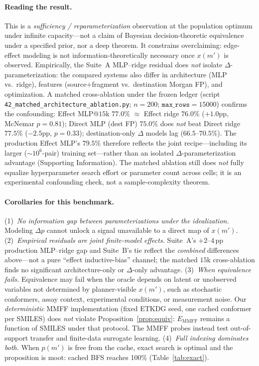 \documentclass[journal=jcisd8,manuscript=article,email=false]{achemso}
\begin{document}
\paragraph{Reading the result.}
This is a \emph{sufficiency / reparameterization} observation at the population optimum under infinite capacity---not a claim of Bayesian decision-theoretic equivalence under a specified prior, nor a deep theorem. It constrains overclaiming: edge-effect modeling is not information-theoretically necessary once $x(m')$ is observed. Empirically, the Suite~A MLP--ridge residual does \emph{not} isolate $\Delta$-parameterization: the compared systems also differ in architecture (MLP vs.\ ridge), features (source$+$fragment vs.\ destination Morgan FP), and optimization. A matched cross-ablation under the frozen ledger (script \texttt{42\_matched\_architecture\_ablation.py}; $n{=}200$; $\texttt{max\_rows}{=}15000$) confirms the confounding: Effect MLP@$15$k $77.0\%$ $\approx$ Effect ridge $76.0\%$ ($+1.0$pp, McNemar $p{=}0.81$); Direct MLP (dest FP) $75.0\%$ does \emph{not} beat Direct ridge $77.5\%$ ($-2.5$pp, $p{=}0.33$); destination-only $\Delta$ models lag ($66.5$--$70.5\%$). The production Effect MLP's $79.5\%$ therefore reflects the joint recipe---including its larger ($\sim$$10^6$-pair) training set---rather than an isolated $\Delta$-parameterization advantage (Supporting Information). The matched ablation still does \emph{not} fully equalize hyperparameter search effort or parameter count across cells; it is an experimental confounding check, not a sample-complexity theorem.

\paragraph{Corollaries for this benchmark.}
(1)~\emph{No information gap between parameterizations under the idealization.} Modeling $\Delta p$ cannot unlock a signal unavailable to a direct map of $x(m')$. (2)~\emph{Empirical residuals are joint finite-model effects.} Suite~A's $+2$--$4$\,pp production MLP--ridge gap and Suite~B's tie reflect the \emph{combined} differences above---not a pure ``effect inductive-bias'' channel; the matched $15$k cross-ablation finds no significant architecture-only or $\Delta$-only advantage. (3)~\emph{When equivalence fails.} Equivalence may fail when the oracle depends on latent or unobserved variables not determined by planner-visible $x(m')$, such as stochastic conformers, assay context, experimental conditions, or measurement noise. Our \emph{deterministic} MMFF implementation (fixed ETKDG seed, one cached conformer per SMILES) does \emph{not} violate Proposition~\ref{prop:equiv}: $E_{\mathrm{MMFF}}$ remains a function of SMILES under that protocol. The MMFF probes instead test out-of-support transfer and finite-data surrogate learning. (4)~\emph{Full indexing dominates both.} When $p(m')$ is free from the cache, exact search is optimal and the proposition is moot: cached BFS reaches 100\% (Table~\ref{tab:exact}).
\end{document}
